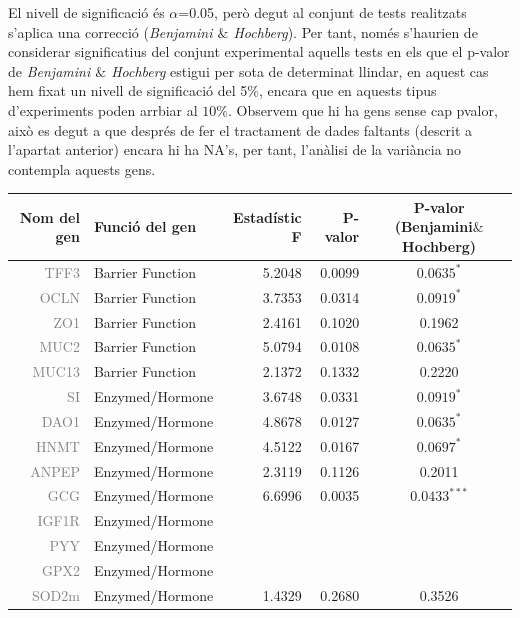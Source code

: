 \documentclass[english]{article}
\begin{document}
\noindent El nivell de significació és $\alpha$=0.05, però degut al conjunt de tests realitzats s'aplica una correcció (\textit{Benjamini $\&$ Hochberg}). Per tant, només s'haurien de considerar significatius del conjunt experimental aquells tests en els que el p-valor de \textit{Benjamini $\&$ Hochberg} estigui per sota de determinat llindar, en aquest cas hem fixat un nivell de significació del 5$\%$, encara que en aquests tipus d'experiments poden arrbiar al $10\%$. Observem que hi ha gens sense cap pvalor, això es degut a que després de fer el tractament de dades faltants (descrit a l'apartat anterior) encara hi ha NA's, per tant, l'anàlisi de la variància no contempla aquests gens.
\onecolumn
\begin{table}[ht]
\centering
\begin{tabular}{rlrrc}
  \toprule
 {\textbf{Nom del gen}} & {\textbf{Funció del gen }} & {\textbf{Estadístic F}} & {\textbf{P-valor}} & {\textbf{P-valor (Benjamini$\&$Hochberg)}} \\
  \midrule
{\textcolor{gray}{TFF3}} & Barrier Function & 5.2048 & 0.0099 & $0.0635^{*}$  \\
  {\textcolor{gray}{OCLN}} & Barrier Function & 3.7353 & 0.0314 & $0.0919^{*}$  \\
  {\textcolor{gray}{ZO1}} & Barrier Function & 2.4161 & 0.1020 & 0.1962 \\
  {\textcolor{gray}{MUC2}} & Barrier Function & 5.0794 & 0.0108 & $0.0635^{*}$  \\
  {\textcolor{gray}{MUC13}} & Barrier Function & 2.1372 & 0.1332 & 0.2220 \\
  {\textcolor{gray}{SI}} & Enzymed/Hormone & 3.6748 & 0.0331 & $0.0919^{*}$  \\
  {\textcolor{gray}{DAO1}} & Enzymed/Hormone & 4.8678 & 0.0127 & $0.0635^{*}$  \\
  {\textcolor{gray}{HNMT}} & Enzymed/Hormone & 4.5122 & 0.0167 & $0.0697^{*}$  \\
  {\textcolor{gray}{ANPEP}} & Enzymed/Hormone & 2.3119 & 0.1126 & 0.2011 \\
  {\textcolor{gray}{GCG}} & Enzymed/Hormone & 6.6996 & 0.0035 & $0.0433^{***}$ \\
  {\textcolor{gray}{IGF1R}} & Enzymed/Hormone &  &  &  \\
  {\textcolor{gray}{PYY}} & Enzymed/Hormone &  &  &  \\
  {\textcolor{gray}{GPX2}} & Enzymed/Hormone &  &  &  \\
  {\textcolor{gray}{SOD2m}} & Enzymed/Hormone & 1.4329 & 0.2680 & 0.3526 \\

\end{tabular}
\end{table}
\end{document}
